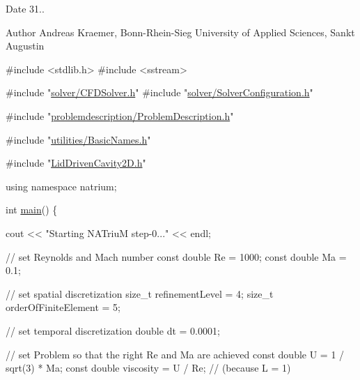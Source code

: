 \begin{DoxyDate}{Date}
31.. 
\end{DoxyDate}
\begin{DoxyAuthor}{Author}
Andreas Kraemer, Bonn-\/\-Rhein-\/\-Sieg University of Applied Sciences, Sankt Augustin
\end{DoxyAuthor}

\begin{DoxyCodeInclude}

\textcolor{preprocessor}{#include <stdlib.h>}
\textcolor{preprocessor}{#include <sstream>}

\textcolor{preprocessor}{#include "\hyperlink{CFDSolver_8h}{solver/CFDSolver.h}"}
\textcolor{preprocessor}{#include "\hyperlink{SolverConfiguration_8h}{solver/SolverConfiguration.h}"}

\textcolor{preprocessor}{#include "\hyperlink{ProblemDescription_8h}{problemdescription/ProblemDescription.h}"}

\textcolor{preprocessor}{#include "\hyperlink{BasicNames_8h}{utilities/BasicNames.h}"}

\textcolor{preprocessor}{#include "\hyperlink{LidDrivenCavity2D_8h}{LidDrivenCavity2D.h}"}

\textcolor{keyword}{using namespace }natrium;



\textcolor{keywordtype}{int} \hyperlink{step-0_8cpp_ae66f6b31b5ad750f1fe042a706a4e3d4}{main}() \{

        cout << \textcolor{stringliteral}{"Starting NATriuM step-0..."} << endl;

        \textcolor{comment}{// set Reynolds and Mach number}
        \textcolor{keyword}{const} \textcolor{keywordtype}{double} Re = 1000;
        \textcolor{keyword}{const} \textcolor{keywordtype}{double} Ma = 0.1;

        \textcolor{comment}{// set spatial discretization}
        \textcolor{keywordtype}{size\_t} refinementLevel = 4;
        \textcolor{keywordtype}{size\_t} orderOfFiniteElement = 5;

        \textcolor{comment}{// set temporal discretization}
        \textcolor{keywordtype}{double} dt = 0.0001;

        \textcolor{comment}{// set Problem so that the right Re and Ma are achieved}
        \textcolor{keyword}{const} \textcolor{keywordtype}{double} U = 1 / sqrt(3) * Ma;
        \textcolor{keyword}{const} \textcolor{keywordtype}{double} viscosity = U / Re; \textcolor{comment}{// (because L = 1)}


\end{DoxyCodeInclude}
